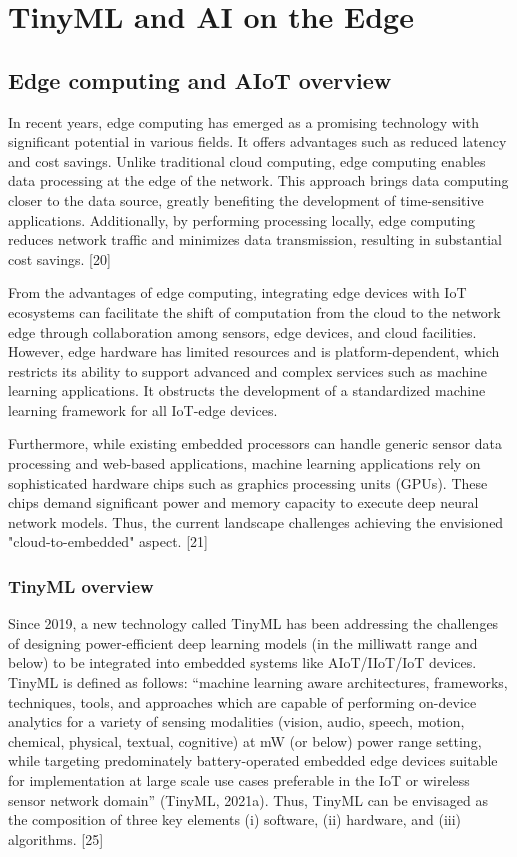 \section{TinyML and AI on the Edge}
\subsection{Edge computing and AIoT overview}
\indent In recent years, edge computing has emerged as a promising technology with significant potential in various fields. It offers advantages such as reduced latency and cost savings. Unlike traditional cloud computing, edge computing enables data processing at the edge of the network. 
This approach brings data computing closer to the data source, greatly benefiting the development of time-sensitive applications. Additionally, by performing processing locally, edge computing reduces network traffic and minimizes data transmission, resulting in substantial cost savings. [20]

From the advantages of edge computing, integrating edge devices with IoT ecosystems can facilitate the shift of computation from the cloud to the network edge through collaboration among sensors, edge devices, and cloud facilities.
However, edge hardware has limited resources and is platform-dependent, which restricts its ability to support advanced and complex services such as machine learning applications. It obstructs the development of a standardized machine learning framework for all IoT-edge devices.

Furthermore, while existing embedded processors can handle generic sensor data processing and web-based applications, machine learning applications rely on sophisticated hardware chips such as graphics processing units (GPUs). 
These chips demand significant power and memory capacity to execute deep neural network models. Thus, the current landscape challenges achieving the envisioned "cloud-to-embedded" aspect. [21]

\subsubsection{TinyML overview}
\indent  Since 2019, a new technology called TinyML has been addressing the challenges of designing power-efficient deep learning models (in the milliwatt range and below) to be integrated into embedded systems like AIoT/IIoT/IoT devices.
TinyML is defined as follows: “machine learning aware architectures, frameworks, techniques, tools, and approaches which are capable of performing on-device analytics for a variety of sensing modalities (vision, audio, speech, motion, chemical, physical, textual, cognitive) at mW (or below) power range setting, 
while targeting predominately battery-operated embedded edge devices suitable for implementation at large scale use cases preferable in the IoT or wireless sensor network domain” (TinyML, 2021a). Thus, TinyML can be envisaged as the composition of three key elements (i) software, (ii) hardware, and (iii) algorithms. [25]

